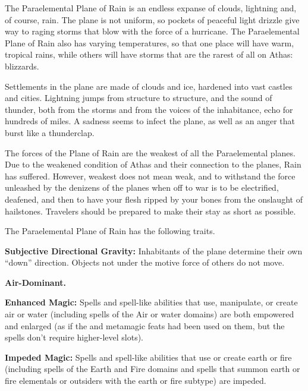 The Paraelemental Plane of Rain is an endless expanse of clouds, lightning and, of course, rain. The plane is not uniform, so pockets of peaceful light drizzle give way to raging storms that blow with the force of a hurricane. The Paraelemental Plane of Rain also has varying temperatures, so that one place will have warm, tropical rains, while others will have storms that are the rarest of all on Athas: blizzards.

Settlements in the plane are made of clouds and ice, hardened into vast castles and cities. Lightning jumps from structure to structure, and the sound of thunder, both from the storms and from the voices of the inhabitance, echo for hundreds of miles. A sadness seems to infect the plane, as well as an anger that burst like a thunderclap.

The forces of the Plane of Rain are the weakest of all the Paraelemental planes. Due to the weakened condition of Athas and their connection to the planes, Rain has suffered. However, weakest does not mean weak, and to withstand the force unleashed by the denizens of the planes when off to war is to be electrified, deafened, and then to have your flesh ripped by your bones from the onslaught of hailstones. Travelers should be prepared to make their stay as short as possible.

The Paraelemental Plane of Rain has the following traits.
\begin{itemize*}
\item \textbf{Subjective Directional Gravity:} Inhabitants of the plane determine their own ``down'' direction. Objects not under the motive force of others do not move.
\item \textbf{Air-Dominant.}
\item \textbf{Enhanced Magic:} Spells and spell-like abilities that use, manipulate, or create air or water (including spells of the Air or water domains) are both empowered and enlarged (as if the  and  metamagic feats had been used on them, but the spells don’t require higher-level slots).
\item \textbf{Impeded Magic:} Spells and spell-like abilities that use or create earth or fire (including spells of the Earth and Fire domains and spells that summon earth or fire elementals or outsiders with the earth or fire subtype) are impeded.
\end{itemize*}
